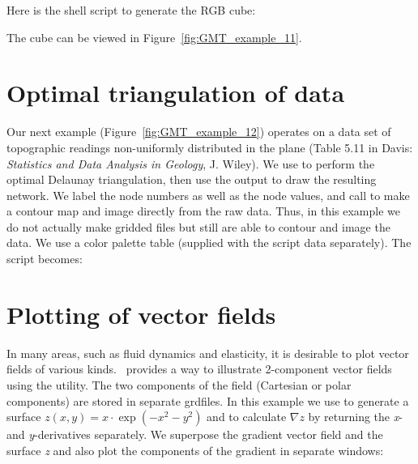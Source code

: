 Here is the shell script to generate the RGB cube:


The cube can be viewed in Figure~\ref{fig:GMT_example_11}.



\section{Optimal triangulation of data}

Our next example (Figure~\ref{fig:GMT_example_12})
operates on a data set of topographic
readings non-uniformly distributed in the plane (Table
5.11 in Davis: {\it Statistics and Data Analysis in Geology},
J. Wiley).  We use  to perform the optimal
Delaunay triangulation, then use the output to draw the
resulting network.  We label the node numbers as well as
the node values, and call  to make a contour
map and image directly from the raw data.  Thus, in this
example we do not actually make gridded files but still
are able to contour and image the data.  We use a color
palette table  (supplied with the script data
separately).  The script becomes:



\section{Plotting of vector fields}

In many areas, such as fluid dynamics and elasticity,
it is desirable to plot vector fields of various kinds.
\GMT\ provides a way to illustrate 2-component vector fields
using the  utility.  The two components of
the field (Cartesian or polar components) are stored in
separate grdfiles.  In this example we use 
to generate a surface $z(x, y) = x \cdot \exp(-x^2 -y^2)$
and to calculate $\nabla z$ by
returning the {\it x}- and {\it y}-derivatives separately.
We superpose the gradient vector field and the surface
{\it z} and also plot the components of the gradient
in separate windows:


